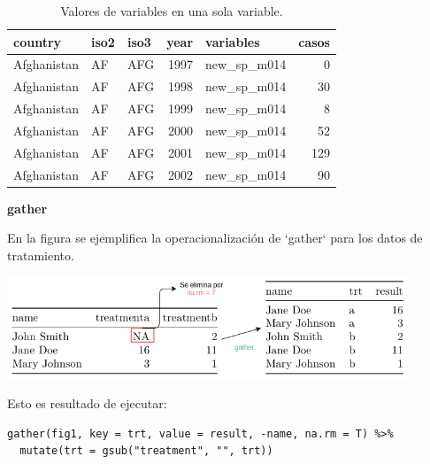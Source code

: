 \documentclass[]{article}
\begin{document}
\begin{table}[ht]
\centering
\begingroup\tiny
\begin{tabular}{lllrlr}
  \hline
country & iso2 & iso3 & year & variables & casos \\ 
  \hline
Afghanistan & AF & AFG & 1997 & new\_sp\_m014 &   0 \\ 
  Afghanistan & AF & AFG & 1998 & new\_sp\_m014 &  30 \\ 
  Afghanistan & AF & AFG & 1999 & new\_sp\_m014 &   8 \\ 
  Afghanistan & AF & AFG & 2000 & new\_sp\_m014 &  52 \\ 
  Afghanistan & AF & AFG & 2001 & new\_sp\_m014 & 129 \\ 
  Afghanistan & AF & AFG & 2002 & new\_sp\_m014 &  90 \\ 
   \hline
\end{tabular}
\endgroup
\caption{Valores de variables en una sola variable.} 
\label{tab:varsjuntadas}
\end{table}

\begin{nota} 
\textbf{gather\\}

En la figura se ejemplifica la operacionalización de `gather` para los datos de tratamiento.

\includegraphics[width=0.9\textwidth]{../img/gather.png}

Esto es resultado de ejecutar: \\

\begin{verbatim}
gather(fig1, key = trt, value = result, -name, na.rm = T) %>% 
  mutate(trt = gsub("treatment", "", trt))
\end{verbatim}

\end{nota}

\renewcommand\bcStyleTitre[1]{\large\textcolor{bbblack}{#1}}
\end{document}
